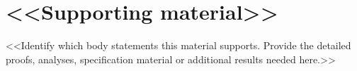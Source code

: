 \section{<<Supporting material>>}\label{app:support}
<<Identify which body statements this material supports. Provide the detailed
proofs, analyses, specification material or additional results needed here.>>
